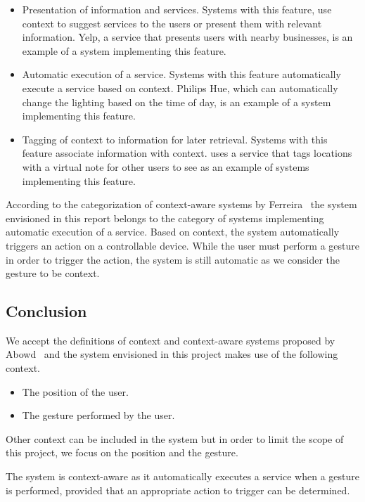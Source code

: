 \begin{itemize}
\item Presentation of information and services. Systems with this feature, use context to suggest services to the users or present them with relevant information. Yelp, a service that presents users with nearby businesses, is an example of a system implementing this feature.
\item Automatic execution of a service. Systems with this feature automatically execute a service based on context. Philips Hue, which can automatically change the lighting based on the time of day, is an example of a system implementing this feature.
\item Tagging of context to information for later retrieval. Systems with this feature associate information with context. \cite{ferreira2014distributed} uses a service that tags locations with a virtual note for other users to see as an example of systems implementing this feature.
\end{itemize}

According to the categorization of context-aware systems by Ferreira \etal~the system envisioned in this report belongs to the category of systems implementing automatic execution of a service. Based on context, the system automatically triggers an action on a controllable device. While the user must perform a gesture in order to trigger the action, the system is still automatic as we consider the gesture to be context.

\subsection{Conclusion}

We accept the definitions of context and context-aware systems proposed by Abowd \etal~and the system envisioned in this project makes use of the following context.

\begin{itemize}
\item The position of the user.
\item The gesture performed by the user.
\end{itemize}

Other context can be included in the system but in order to limit the scope of this project, we focus on the position and the gesture.

The system is context-aware as it automatically executes a service when a gesture is performed, provided that an appropriate action to trigger can be determined.

